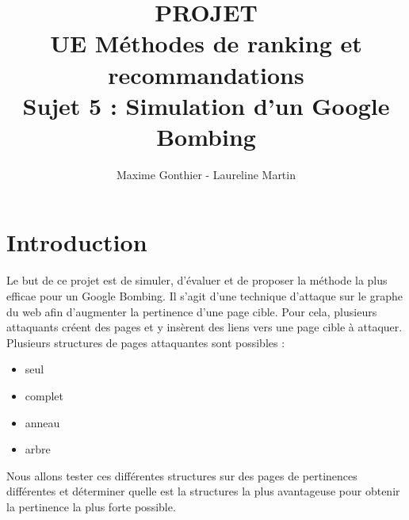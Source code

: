\documentclass[a4paper,11pt]{article}
\title{PROJET\\ UE Méthodes de ranking et recommandations\\ 
		Sujet 5 : Simulation d'un Google Bombing}
\author{Maxime Gonthier - Laureline Martin}
\begin{document}
\clearpage
	\clearpage
	\maketitle
	\newpage\clearpage{}

\newpage
\tableofcontents

\newpage
\section{Introduction}
	Le but de ce projet est de simuler, d'évaluer et de proposer la méthode la plus efficae pour un Google Bombing. Il s'agit d'une technique d'attaque sur le graphe du web afin d'augmenter la pertinence d'une page cible. Pour cela, plusieurs attaquants créent des pages et y insèrent des liens vers une page cible à attaquer. Plusieurs structures de pages attaquantes sont possibles :
	\begin{itemize}
		\item seul
		\item complet
		\item anneau
		\item arbre
	\end{itemize}
	Nous allons tester ces différentes structures sur des pages de pertinences différentes et déterminer quelle est la structures la plus avantageuse pour obtenir la pertinence la plus forte possible.
\end{document}
